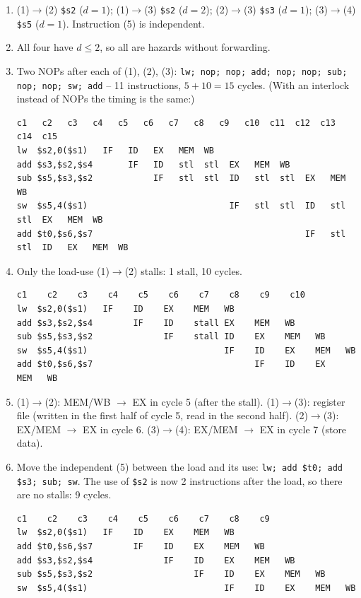 \documentclass[11pt]{article}
\begin{document}
\begin{solution}[\ref{x:hazards}]
\leavevmode
\begin{enumerate}[label=(\alph*),leftmargin=*]
  \item (1)$\to$(2) \texttt{\$s2} ($d=1$); (1)$\to$(3) \texttt{\$s2} ($d=2$);
  (2)$\to$(3) \texttt{\$s3} ($d=1$); (3)$\to$(4) \texttt{\$s5} ($d=1$).
  Instruction (5) is independent.
  \item All four have $d\le2$, so all are hazards without forwarding.
  \item Two NOPs after each of (1), (2), (3):
  \texttt{lw; nop; nop; add; nop; nop; sub; nop; nop; sw; add} -- 11
  instructions, $5+10 = 15$ cycles. (With an interlock instead of NOPs the
  timing is the same:)
\begin{lstlisting}[basicstyle=\ttfamily\scriptsize,keywords={}]
                 c1   c2   c3   c4   c5   c6   c7   c8   c9   c10  c11  c12  c13  c14  c15
lw  $s2,0($s1)   IF   ID   EX   MEM  WB
add $s3,$s2,$s4       IF   ID   stl  stl  EX   MEM  WB
sub $s5,$s3,$s2            IF   stl  stl  ID   stl  stl  EX   MEM  WB
sw  $s5,4($s1)                            IF   stl  stl  ID   stl  stl  EX   MEM  WB
add $t0,$s6,$s7                                          IF   stl  stl  ID   EX   MEM  WB
\end{lstlisting}
  \item Only the load-use (1)$\to$(2) stalls: 1 stall, 10 cycles.
\begin{lstlisting}[basicstyle=\ttfamily\footnotesize,keywords={}]
                 c1    c2    c3    c4    c5    c6    c7    c8    c9    c10
lw  $s2,0($s1)   IF    ID    EX    MEM   WB
add $s3,$s2,$s4        IF    ID    stall EX    MEM   WB
sub $s5,$s3,$s2              IF    stall ID    EX    MEM   WB
sw  $s5,4($s1)                           IF    ID    EX    MEM   WB
add $t0,$s6,$s7                                IF    ID    EX    MEM   WB
\end{lstlisting}
  \item (1)$\to$(2): MEM/WB $\to$ EX in cycle 5 (after the stall).
  (1)$\to$(3): register file (written in the first half of cycle 5, read in
  the second half). (2)$\to$(3): EX/MEM $\to$ EX in cycle 6. (3)$\to$(4):
  EX/MEM $\to$ EX in cycle 7 (store data).
  \item Move the independent (5) between the load and its use:
  \texttt{lw; add \$t0; add \$s3; sub; sw}. The use of \texttt{\$s2} is now
  2 instructions after the load, so there are no stalls: 9 cycles.
\begin{lstlisting}[basicstyle=\ttfamily\footnotesize,keywords={}]
                 c1    c2    c3    c4    c5    c6    c7    c8    c9
lw  $s2,0($s1)   IF    ID    EX    MEM   WB
add $t0,$s6,$s7        IF    ID    EX    MEM   WB
add $s3,$s2,$s4              IF    ID    EX    MEM   WB
sub $s5,$s3,$s2                    IF    ID    EX    MEM   WB
sw  $s5,4($s1)                           IF    ID    EX    MEM   WB
\end{lstlisting}
\end{enumerate}
\end{solution}
\end{document}
